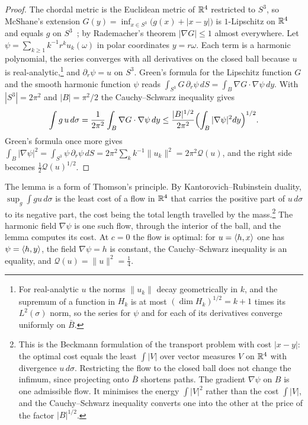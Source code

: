 \begin{proof}
The chordal metric is the Euclidean metric of $\mathbb{R}^4$ restricted to $S^3$,
so McShane's extension $G(y)=\inf_{x\in S^3}\bigl(g(x)+|x-y|\bigr)$
is $1$-Lipschitz on $\mathbb{R}^4$ and equals $g$ on $S^3$~\cite{McS34}; by
Rademacher's theorem $|\nabla G|\le1$ almost everywhere. Let
$\psi=\sum_{k\ge1}k^{-1}r^ku_k(\omega)$ in polar coordinates $y=r\omega$. Each
term is a harmonic polynomial, the series converges with all derivatives on
the closed ball because $u$ is real-analytic,\footnote{For real-analytic
$u$ the norms $\|u_k\|$ decay geometrically in $k$, and the supremum of a
function in $H_k$ is at most $(\dim H_k)^{1/2}=k+1$ times its $L^2(\sigma)$
norm, so the series for $\psi$ and for each of its derivatives converge
uniformly on $\bar B$.} and $\partial_r\psi=u$ on $S^3$. Green's formula for
the Lipschitz function $G$ and the smooth harmonic function $\psi$ reads
$\int_{S^3}G\,\partial_r\psi\,dS=\int_B\nabla G\cdot\nabla\psi\,dy$. With
$|S^3|=2\pi^2$ and $|B|=\pi^2/2$ the Cauchy--Schwarz inequality gives
\[
\int g\,u\,d\sigma=\frac1{2\pi^2}\int_B\nabla G\cdot\nabla\psi\,dy\le
\frac{|B|^{1/2}}{2\pi^2}\Bigl(\int_B|\nabla\psi|^2dy\Bigr)^{1/2}.
\]
Green's formula once more gives $\int_B|\nabla\psi|^2=\int_{S^3}\psi\,
\partial_r\psi\,dS=2\pi^2\sum_kk^{-1}\|u_k\|^2=2\pi^2\mathcal Q(u)$, and the
right side becomes $\frac12\mathcal Q(u)^{1/2}$.
\end{proof}

The lemma is a form of Thomson's principle. By Kantorovich--Rubinstein
duality, $\sup_g\int gu\,d\sigma$ is the least cost of a flow in $\mathbb{R}^4$ that
carries the positive part of $u\,d\sigma$ to its negative part, the cost
being the total length travelled by the mass.\footnote{This is the
Beckmann formulation of the transport problem with cost $|x-y|$: the
optimal cost equals the least $\int|V|$ over vector measures $V$ on $\mathbb{R}^4$
with divergence $u\,d\sigma$. Restricting the flow to the closed ball does
not change the infimum, since projecting onto $\bar B$ shortens paths. The
gradient $\nabla\psi$ on $B$ is one admissible flow. It minimises the energy
$\int|V|^2$ rather than the cost $\int|V|$, and the Cauchy--Schwarz inequality
converts one into the other at the price of the factor $|B|^{1/2}$.} The
harmonic field $\nabla\psi$ is one such flow, through the interior of the
ball, and the lemma computes its cost. At $c=0$ the flow is optimal: for
$u=\langle h,x\rangle$ one has $\psi=\langle h,y\rangle$, the field $\nabla\psi=h$ is constant,
the Cauchy--Schwarz inequality is an equality, and $\mathcal Q(u)=\|u\|^2=
\frac14$.

